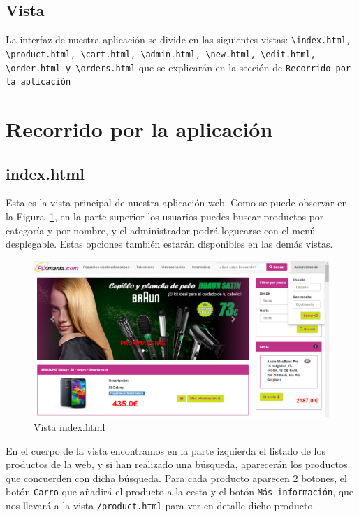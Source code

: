 \documentclass[12pt,a4paper,svgnames]{article}
\begin{document}
\subsection{Vista}
La interfaz de nuestra aplicación se divide en las siguientes vistas:
\texttt{\textbackslash index.html, \textbackslash product.html, \textbackslash cart.html, \textbackslash admin.html, \textbackslash new.html, \textbackslash edit.html, \textbackslash order.html y \textbackslash orders.html} que se explicarán en la sección de \texttt{Recorrido por la aplicación}


\clearpage

\section{Recorrido por la aplicación}

\subsection{index.html}
Esta es la vista principal de nuestra aplicación web. Como se puede observar en la Figura~\ref{fig:index_sin_admin}, en la parte superior los usuarios puedes buscar productos por categoría y por nombre, y el administrador podrá loguearse con el menú desplegable. Estas opciones también estarán disponibles en las demás vistas.

\begin{figure}[htbp]
\centering
\includegraphics[width=1\linewidth]{imagenes/index_con_admin}
\caption{Vista index.html}
\label{fig:index_sin_admin}
\end{figure}

En el cuerpo de la vista encontramos en la parte izquierda el listado de los productos de la web, y si han realizado una búsqueda, aparecerán los productos que concuerden con dicha búsqueda. 
Para cada producto aparecen 2 botones, el botón \texttt{Carro} que añadirá el producto a la cesta y el botón \texttt{Más información}, que nos llevará a la vista \texttt{/product.html} para ver en detalle dicho producto.\\
\end{document}
